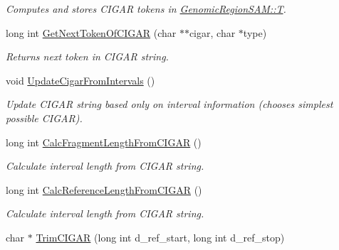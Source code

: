\begin{CompactItemize}
\begin{CompactList}\small\item\em Computes and stores CIGAR tokens in \hyperlink{classGenomicRegionSAM_47afdde68b89cf4ea199bc91d4954a92}{GenomicRegionSAM::T}. \item\end{CompactList}\item 
\hypertarget{classGenomicRegionSAM_50198fead1c40caadf76f40b61a3c14a}{
long int \hyperlink{classGenomicRegionSAM_50198fead1c40caadf76f40b61a3c14a}{GetNextTokenOfCIGAR} (char $\ast$$\ast$cigar, char $\ast$type)}
\label{classGenomicRegionSAM_50198fead1c40caadf76f40b61a3c14a}

\begin{CompactList}\small\item\em Returns next token in CIGAR string. \item\end{CompactList}\item 
\hypertarget{classGenomicRegionSAM_965bb3cc1217e6c859a07dd23090c2a0}{
void \hyperlink{classGenomicRegionSAM_965bb3cc1217e6c859a07dd23090c2a0}{UpdateCigarFromIntervals} ()}
\label{classGenomicRegionSAM_965bb3cc1217e6c859a07dd23090c2a0}

\begin{CompactList}\small\item\em Update CIGAR string based only on interval information (chooses simplest possible CIGAR). \item\end{CompactList}\item 
\hypertarget{classGenomicRegionSAM_5de5d05dfccd33149153a299c1cb2f6b}{
long int \hyperlink{classGenomicRegionSAM_5de5d05dfccd33149153a299c1cb2f6b}{CalcFragmentLengthFromCIGAR} ()}
\label{classGenomicRegionSAM_5de5d05dfccd33149153a299c1cb2f6b}

\begin{CompactList}\small\item\em Calculate interval length from CIGAR string. \item\end{CompactList}\item 
\hypertarget{classGenomicRegionSAM_acff4cd74a3b8c450f9f90c6b23412c4}{
long int \hyperlink{classGenomicRegionSAM_acff4cd74a3b8c450f9f90c6b23412c4}{CalcReferenceLengthFromCIGAR} ()}
\label{classGenomicRegionSAM_acff4cd74a3b8c450f9f90c6b23412c4}

\begin{CompactList}\small\item\em Calculate interval length from CIGAR string. \item\end{CompactList}\item 
\hypertarget{classGenomicRegionSAM_17e8e7054ffe7205d7c34926b60526d8}{
char $\ast$ \hyperlink{classGenomicRegionSAM_17e8e7054ffe7205d7c34926b60526d8}{TrimCIGAR} (long int d\_\-ref\_\-start, long int d\_\-ref\_\-stop)}
\label{classGenomicRegionSAM_17e8e7054ffe7205d7c34926b60526d8}


\end{CompactItemize}
